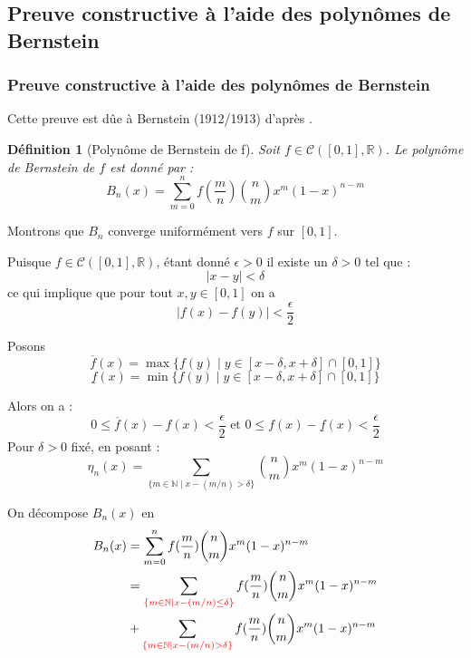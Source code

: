 \documentclass[
	10pt, %
	xcolor={svgnames}
]{beamer}
\newtheorem{defi}[subsubsection]{Définition}
\begin{document}
\begin{frame}
	\section{Preuve constructive à l'aide des polynômes de Bernstein}
	\frametitle{Preuve constructive à l'aide des polynômes de Bernstein}

	Cette preuve est dûe à Bernstein (1912/1913) d'après \cite[p.~ 42-45]{pinkus2000approximation}.
	\begin{defi}[Polynôme de Bernstein de f]
		Soit \( f \in \mathcal{C}([0,1],\mathbb{R}) \). Le polynôme de Bernstein de \( f \) est donné par :
	\begin{equation*}
		B_n(x) = \sum_{m=0}^{n} f(\frac{m}{n}) \binom{n}{m} x^{m}(1-x)^{n-m}
	\end{equation*}
	\end{defi}
Montrons que \( B_n \) converge uniformément vers \( f \) sur \( [0,1] \).


	Puisque \( f \in \mathcal{C}([0,1],\mathbb{R}) \), étant donné \( \epsilon > 0 \) il existe un \( \delta > 0 \) tel que :
	\begin{equation*}
		{\left\lvert x - y\right\rvert} < \delta
	\end{equation*}
	ce qui implique que pour tout \( x, y \in [0,1] \) on a 
	\begin{equation*}
		{\left\lvert f(x) - f(y) \right\rvert} < \frac{\epsilon}{2}
	\end{equation*}

\end{frame}
\begin{frame}
	Posons 
	\begin{equation*}
		\overline{f}(x) = \max\{f(y) \mid y \in [x-\delta, x+\delta] \cap [0,1]\}
	\end{equation*}
	\begin{equation*}
		\underline{f}(x) = \min\{f(y) \mid y \in [x-\delta, x+\delta] \cap [0,1]\}
	\end{equation*}

Alors on a : 
\begin{equation*}
	0 \leq \overline{f}(x) - f(x) < \frac{\epsilon}{2} \text{ et } 0 \leq f(x) - \underline{f}(x) < \frac{\epsilon}{2}
\end{equation*}
Pour \( \delta > 0  \) fixé, en posant :
\begin{equation*}
	\eta_n(x) = \sum_{\{m \in \mathbb{N} \mid x - (m/n) > \delta \}} \binom{n}{m} x^{m}(1-x)^{n-m}
\end{equation*}

On décompose \( B_n(x) \) en 
\begin{align*}
	B_n(x) &= \sum_{m=0}^{n} f(\frac{m}{n}) \binom{n}{m} x^{m}(1-x)^{n-m} \\
	       &= \sum_{\mathcolor{red}{\{m \in \mathbb{N} \mid x - (m/n) {\leq} \delta \}}} f(\frac{m}{n}) \binom{n}{m} x^{m}(1-x)^{n-m} \\
	       &+ \sum_{\mathcolor{red}{\{m \in \mathbb{N} \mid x - (m/n) > \delta \}}} f(\frac{m}{n}) \binom{n}{m} x^{m}(1-x)^{n-m} \\
\end{align*}
\end{frame}
\end{document}
